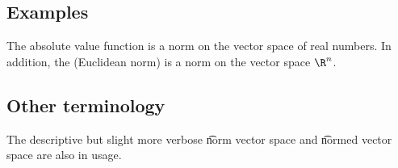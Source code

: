 \subsection*{Examples}

The absolute value function is a norm on the vector space of real numbers.
In addition, the (Euclidean norm) is a norm on the vector space $\R ^n$.

\subsection*{Other terminology}

The descriptive but slight more verbose \t{norm vector space} and \t{normed vector space} are also in usage.
